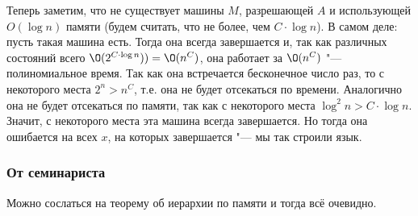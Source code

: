 		Теперь заметим, что не существует машины $M$, разрешающей $A$ и использующей $O(\log n)$ памяти
		(будем считать, что не более, чем $C\cdot \log n$).
		В самом деле: пусть такая машина есть.
		Тогда она всегда завершается и, так как различных состояний всего $\O(2^{C \cdot \log n}))=\O(n^C)$,
		она работает за $\O(n^C)$ "--- полиномиальное время.
		Так как она встречается бесконечное число раз, то с некоторого места $2^n > n^C$, т.е. она
		не будет отсекаться по времени.
		Аналогично она не будет отсекаться по памяти, так как с некоторого места $\log^2n > C \cdot \log n$.
		Значит, с некоторого места эта машина всегда завершается.
		Но тогда она ошибается на всех $x$, на которых завершается "--- мы так строили язык.

	\subsubsection{От семинариста}
		Можно сослаться на теорему об иерархии по памяти и тогда всё очевидно.

